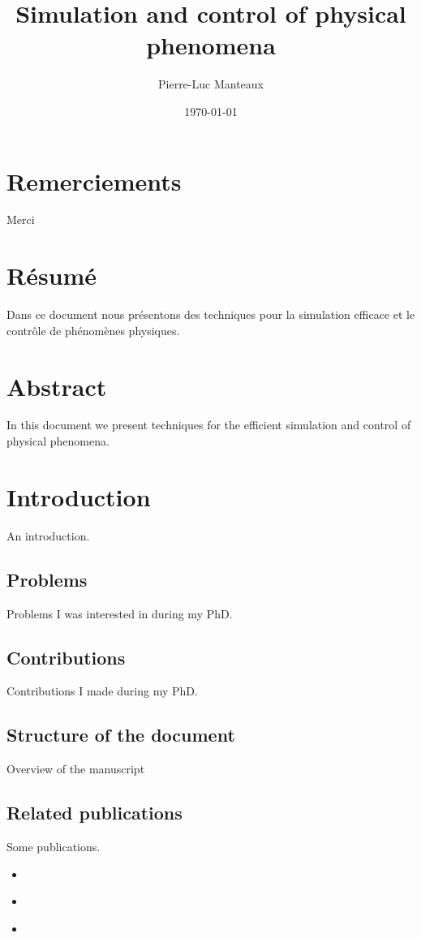 \documentclass[11pt, oneside, a4paper]{memoir}
\begin{document}
\title{Simulation and control of physical phenomena}
\author{Pierre-Luc Manteaux}
\date{\today}
\maketitle

\frontmatter
\chapter{Remerciements}
Merci

\chapter{R\'esum\'e}
Dans ce document nous pr\'esentons des techniques pour la simulation efficace et le contr\^ole de ph\'enom\`enes physiques.

\chapter{Abstract}
In this document we present techniques for the efficient simulation and control of physical phenomena.

\tableofcontents

\mainmatter

\chapter{Introduction}
An introduction.

\section{Problems}
Problems I was interested in during my PhD.

\section{Contributions}
Contributions I made during my PhD.

\section{Structure of the document}
Overview of the manuscript

\section{Related publications}
Some publications.
\begin{itemize}
    \item \cite{Manteaux2013}
    \item \cite{Lejemble2015}
    \item \cite{Manteaux2015}
\end{itemize}
\end{document}
